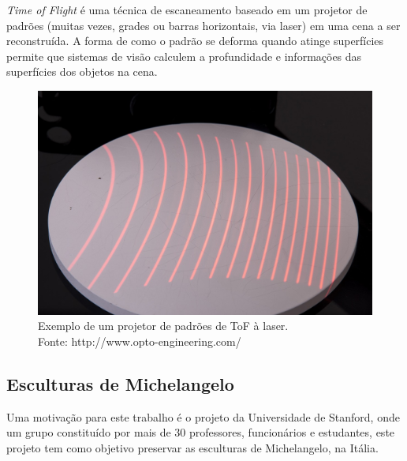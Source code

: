 \documentclass[table, usenames, svgnames, xcolor=dvipsnames]{beamer}
\begin{document}
\begin{frame}
	\begin{center}
		\emph{Time of Flight} é uma técnica de escaneamento baseado em um projetor de padrões (muitas vezes, grades ou barras horizontais, via laser) em uma cena a ser reconstruída. A forma de como o padrão se deforma quando atinge superfícies permite que sistemas de visão calculem a profundidade e informações das superfícies dos objetos na cena.
	\end{center}
\end{frame}

\begin{frame}
	\begin{figure}
		\begin{center}
		\centering
		\includegraphics[width=0.7\linewidth]{figs/luzestruturada.jpg}
		\caption{Exemplo de um projetor de padrões de ToF à laser. \\
		\tiny{Fonte: http://www.opto-engineering.com/}
		}
	\end{center}
\end{figure}	 

\end{frame}

\subsection{Esculturas de Michelangelo}

\begin{frame} 
	\begin{center}
		Uma motivação para este trabalho é o projeto da Universidade de Stanford, onde um grupo constituído por mais de 30 professores, funcionários e estudantes, este projeto tem como objetivo preservar as esculturas de Michelangelo, na Itália.
	\end{center}
\end{frame}
\end{document}
